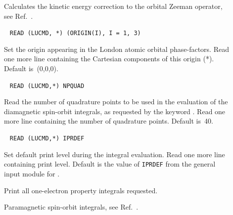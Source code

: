 \begin{description}
\item[] Calculates the kinetic energy correction to the
  orbital Zeeman operator, see Ref.~\cite{pmpljvkrjcp119}.


\item[]\verb| |\newline
\verb|READ (LUCMD, *) (ORIGIN(I), I = 1, 3)|

Set the origin appearing in the London atomic orbital phase-factors.
Read one more line containing the Cartesian components of this origin (*).
Default is~(0,0,0).

\item[]\verb| |\newline
\verb|READ (LUCMD,*) NPQUAD|

Read the number of quadrature points to be
used in the evaluation of
the diamagnetic spin-orbit integrals, as
requested by the keyword
. Read one more line containing the number of quadrature
points. Default is~40.

\item[]\verb| |\newline
\verb|READ (LUCMD,*) IPRDEF|

Set default print level during the integral evaluation.  Read one more line
containing print level. Default is the value of \verb|IPRDEF|
from the general input module for {\dalton}.

\item[] Print all one-electron property integrals requested.

\item[] Paramagnetic spin-orbit integrals, see
Ref.~\cite{ovhapjhjajsbpthjcp96}.



\end{description}
